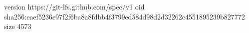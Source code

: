 version https://git-lfs.github.com/spec/v1
oid sha256:eaef5236e97f2f6ba8a8fdbb4f3799ed584d98d2d32262c4551895239b827772
size 4573
